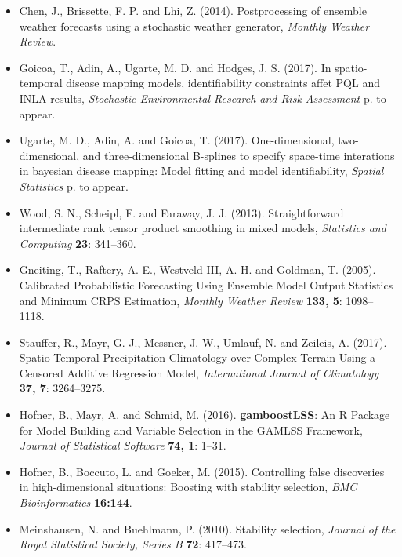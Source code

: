 \documentclass[american,foldmarks=false,noconfig]{uibklttr}
\begin{document}
\begin{itemize}[leftmargin=*]

\item[] Chen, J., Brissette, F. P. and Lhi, Z. (2014). Postprocessing 
of ensemble weather forecasts using a stochastic weather generator, 
\textit{Monthly Weather Review}.

\item[] Goicoa, T., Adin, A., Ugarte, M. D. and Hodges, J. S. (2017). 
In spatio-temporal disease mapping models, identifiability constraints 
affet PQL and INLA results, \textit{Stochastic Environmental Research 
and Risk Assessment} p. to appear.

\item[] Ugarte, M. D., Adin, A. and Goicoa, T. (2017). One-dimensional, 
two-dimensional, and three-dimensional B-splines to specify space-time 
interations in bayesian disease mapping: Model fitting and model 
identifiability, \textit{Spatial Statistics} p. to appear.

\item[] Wood, S. N., Scheipl, F. and Faraway, J. J. (2013). 
Straightforward intermediate rank tensor product smoothing in mixed models, 
\textit{Statistics and Computing} \textbf{23}: 341--360.

\item[] Gneiting, T., Raftery, A. E., Westveld III, A. H. and Goldman, T. (2005). 
Calibrated Probabilistic Forecasting Using Ensemble Model Output Statistics and 
Minimum CRPS Estimation,
\textit{Monthly Weather Review} \textbf{133, 5}: 1098--1118.

\item[] Stauffer, R., Mayr, G. J., Messner, J. W., Umlauf, N. and Zeileis, A. (2017). 
Spatio-Temporal Precipitation Climatology over Complex Terrain Using a Censored Additive Regression Model,
\textit{International Journal of Climatology} \textbf{37, 7}: 3264--3275.

\item[] Hofner, B., Mayr, A. and Schmid, M. (2016). 
\textbf{gamboostLSS}: An \textsf{R} Package for Model Building and 
Variable Selection in the {GAMLSS} Framework,
\textit{Journal of Statistical Software} \textbf{74, 1}: 1--31.

\item[] Hofner, B., Boccuto, L. and Goeker, M. (2015). 
Controlling false discoveries in high-dimensional situations: Boosting 
with stability selection,
\textit{BMC Bioinformatics} \textbf{16:144}.

\item[] Meinshausen, N. and Buehlmann, P. (2010). 
Stability selection,
\textit{Journal of the Royal Statistical Society, Series B} 
\textbf{72}: 417--473.

\end{itemize}
\end{document}

